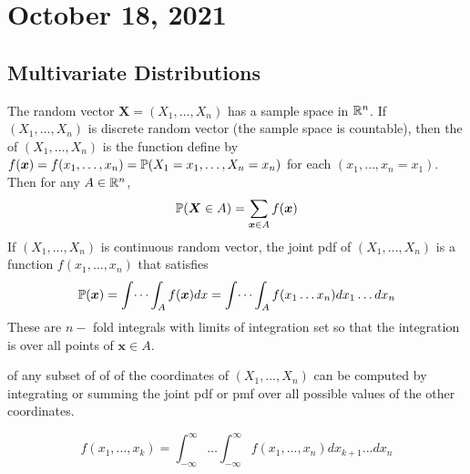 \section{October 18, 2021}
\subsection{Multivariate Distributions}
The random vector $\boldsymbol{X} = (X_1,\dots,X_n)$ has a sample space in $\mathbb R^n$. If $(X_1,\dots,X_n)$ is discrete random vector (the sample space is countable), then the  of $(X_1,\dots,X_n)$ is the function define by $f(\boldsymbol{x}) = f(x_1,\dots,x_n) = \mathbb P(X_1 =x_1,\dots,X_n=x_n)$ for each $(x_1,\dots,x_n=x_1)$. Then for any $A \in \mathbb R^n $,
$$
\mathbb P(\boldsymbol{X} \in A) = \sum_{\boldsymbol{x} \in A} f(\boldsymbol{x})
$$
If $(X_1,\dots,X_n)$ is continuous random vector, the joint pdf of $(X_1,\dots,X_n)$ is a function $f(x_1,\dots,x_n)$ that satisfies 
$$
\mathbb P(\boldsymbol{x}) = \int \dots \int_{A} f(\boldsymbol{x}) dx = \int \dots \int_{A} f(x_1 \dots x_n) dx_1 \dots dx_n
$$
These are $n-$ fold integrals with limits of integration set so that the integration is over all points of $ \boldsymbol{x} \in A$.

\begin{note}
 of any subset of of of the coordinates of $(X_1,\dots,X_n)$ can be computed by integrating or summing the joint pdf or pmf over all possible values of the other coordinates. 

$$
f(x_1,...,x_k) = \int_{- \infty}^{\infty} \dots \int_{- \infty}^{\infty} f(x_1,...,x_n)dx_{k+1}...dx_{n}
$$
\end{note}
